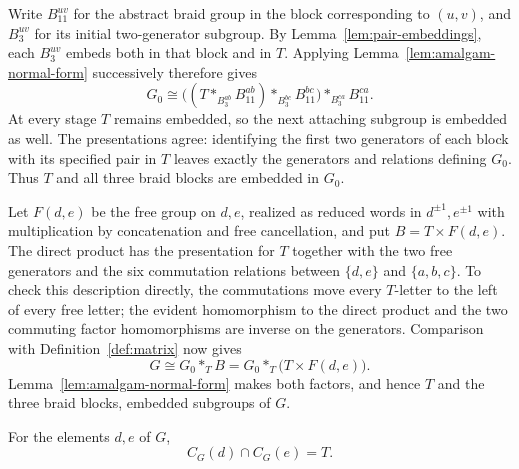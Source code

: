 Write $B_{11}^{uv}$ for the abstract braid group in the block
corresponding to $(u,v)$, and $B_3^{uv}$ for its initial two-generator
subgroup.  By Lemma~\ref{lem:pair-embeddings}, each $B_3^{uv}$ embeds
both in that block and in $T$.  Applying
Lemma~\ref{lem:amalgam-normal-form} successively therefore gives
\begin{equation}\label{eq:iterated-amalgam}
 G_0\cong
 \bigl((T*_{B_3^{ab}}B_{11}^{ab})
       *_{B_3^{bc}}B_{11}^{bc}\bigr)
       *_{B_3^{ca}}B_{11}^{ca}.
\end{equation}
At every stage $T$ remains embedded, so the next attaching subgroup
is embedded as well.  The presentations agree: identifying the
first two generators of each block with its specified pair in $T$
leaves exactly the generators and relations defining $G_0$.
Thus $T$ and all three braid blocks are embedded in $G_0$.

Let $F(d,e)$ be the free group on $d,e$, realized as reduced words
in $d^{\pm1},e^{\pm1}$ with multiplication by concatenation and
free cancellation, and put
$B=T\times F(d,e)$.  The direct product has the presentation for $T$
together with the two free generators and the six commutation
relations between $\{d,e\}$ and $\{a,b,c\}$.  To check this description
directly, the commutations move every $T$-letter to the left of every
free letter; the evident homomorphism to the direct product and
the two commuting factor homomorphisms are inverse on the generators.
Comparison with Definition~\ref{def:matrix} now gives
\begin{equation}\label{eq:full-amalgam}
 G\cong G_0*_T B
       =G_0*_T\bigl(T\times F(d,e)\bigr).
\end{equation}
Lemma~\ref{lem:amalgam-normal-form} makes both factors, and hence
$T$ and the three braid blocks, embedded subgroups of $G$.

\begin{lemma}\label{lem:common-centralizer}
For the elements $d,e$ of $G$,
\[
 C_G(d)\cap C_G(e)=T.
\]
\end{lemma}

